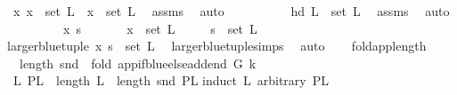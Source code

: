 \begin{isabellebody}
\ {\isachardoublequoteopen}\ {\isasymAnd}x{\isachardot}{\kern0pt}\ x\ {\isasymin}\ set\ L\ {\isasymLongrightarrow}\ x\ {\isasymin}\ set\ L{\isachardoublequoteclose}\ \isamarkupfalse%
\ assms\ \isamarkupfalse%
\ auto\isanewline
\ \ \isamarkupfalse%
\ \isanewline
\ \ \ \ \isamarkupfalse%
\ {\isachardoublequoteopen}hd\ L\ {\isasymin}\ set\ L{\isachardoublequoteclose}\ \isamarkupfalse%
\ assms\ \isamarkupfalse%
\ auto\isanewline
\ \ \isamarkupfalse%
\ \isanewline
\ \ \ \ \isamarkupfalse%
\ x\ s\ \isanewline
\ \ \ \ \isamarkupfalse%
\ {\isachardoublequoteopen}x\ {\isasymin}\ set\ L{\isachardoublequoteclose}\isanewline
\ \ \ \ \ {\isachardoublequoteopen}s\ {\isasymin}\ set\ L{\isachardoublequoteclose}\isanewline
\ \ \ \ \isamarkupfalse%
\ \isamarkupfalse%
\ {\isachardoublequoteopen}larger{\isacharunderscore}{\kern0pt}blue{\isacharunderscore}{\kern0pt}tuple\ x\ s\ {\isasymin}\ set\ L{\isachardoublequoteclose}\ \isamarkupfalse%
\ larger{\isacharunderscore}{\kern0pt}blue{\isacharunderscore}{\kern0pt}tuple{\isachardot}{\kern0pt}simps\ \isamarkupfalse%
\ auto\isanewline
\ \ \isamarkupfalse%
%
\endisatagproof
{\isafoldproof}%
%
\isadelimproof
%
\endisadelimproof
%
\isadelimdocument
%
\endisadelimdocument
%
\isatagdocument
%
\isamarkuptrue%
%
\endisatagdocument
{\isafolddocument}%
%
\isadelimdocument
%
\endisadelimdocument
{}\isamarkupfalse%
\ fold{\isacharunderscore}{\kern0pt}app{\isacharunderscore}{\kern0pt}length{\isacharcolon}{\kern0pt}\isanewline
\ \ \ {\isachardoublequoteopen}length\ {\isacharparenleft}{\kern0pt}snd\ \ {\isacharparenleft}{\kern0pt}fold\ {\isacharparenleft}{\kern0pt}app{\isacharunderscore}{\kern0pt}if{\isacharunderscore}{\kern0pt}blue{\isacharunderscore}{\kern0pt}else{\isacharunderscore}{\kern0pt}add{\isacharunderscore}{\kern0pt}end\ G\ k{\isacharparenright}{\kern0pt}\ \isanewline
\ \ L{}\ PL{}{\isacharparenright}{\kern0pt}{\isacharparenright}{\kern0pt}\ {\isacharequal}{\kern0pt}\ length\ L{}\ {\isacharplus}{\kern0pt}\ length\ {\isacharparenleft}{\kern0pt}snd\ PL{}{\isacharparenright}{\kern0pt}{\isachardoublequoteclose}\isanewline
%
\isadelimproof
%
\endisadelimproof
%
\isatagproof
{}\isamarkupfalse%
{\isacharparenleft}{\kern0pt}induct\ L{}\ arbitrary{\isacharcolon}{\kern0pt}\ PL{}{\isacharparenright}{\kern0pt}\isanewline

\end{isabellebody}
